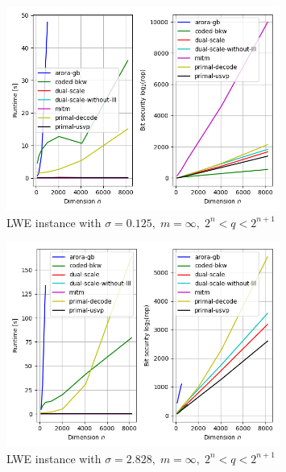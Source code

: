\begin{figure}[]
    \centering
    \includegraphics[width=0.8\textwidth]{graphics/LWE_stddev=0,125_plots_200s.png}
    \caption{LWE instance with $\sigma=0.125,\; m=\infty, \; 2^{n} < q < 2^{n+1}$}\label{fig:LWE-algs-small}
\end{figure}

\begin{figure}[]
    \centering
    \includegraphics[width=0.8\textwidth]{graphics/LWE_stddev=2,828_plots_200s.png}
    \caption{LWE instance with $\sigma=2.828,\; m=\infty, \; 2^{n} < q < 2^{n+1}$}\label{fig:LWE-algs-large}
\end{figure}

